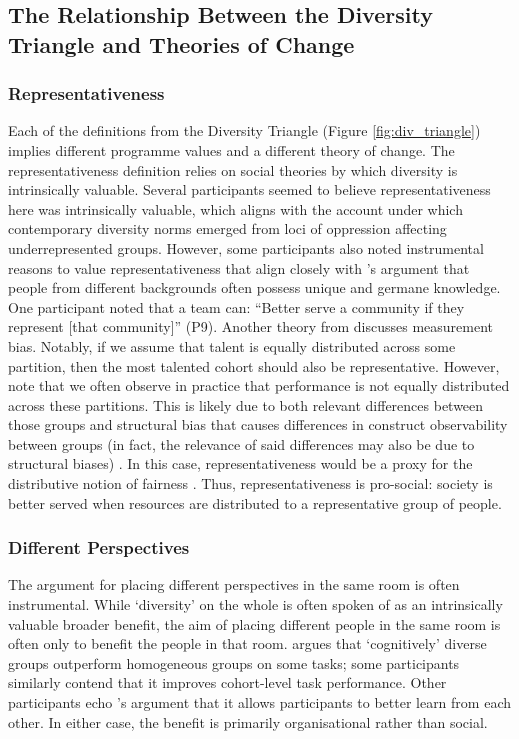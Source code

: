 \subsection{The Relationship Between the Diversity Triangle and Theories of Change}
\subsubsection{Representativeness}
Each of the definitions from the Diversity Triangle (Figure \ref{fig:div_triangle}) implies different programme values and a different theory of change. The representativeness
definition relies on social theories by which diversity is intrinsically valuable. Several participants seemed to believe representativeness here was intrinsically valuable, which aligns with the \textcite{morris1984origins} account under which contemporary diversity norms emerged from loci of oppression affecting underrepresented groups. However, some participants also noted instrumental reasons to value representativeness that align closely with \textcite{peters2021hidden,page2008difference}'s argument that people from different backgrounds often possess unique and germane knowledge. One participant noted that a team can: ``Better serve a community if they represent [that community]'' (P9). Another theory from \textcite{Friedler_Scheidegger_Venkatasubramanian_2016} discusses measurement bias. Notably, if we assume that talent is equally distributed across some partition, then the most talented cohort should also be representative. However, \textcite{Friedler_Scheidegger_Venkatasubramanian_2016} note that we often observe in practice that performance is not equally distributed across these partitions. This is likely due to both relevant differences between those groups and structural bias that causes differences in construct observability between groups (in fact, the relevance of said differences may also be due to structural biases) \cite{Friedler_Scheidegger_Venkatasubramanian_2016}. In this case, representativeness would be a proxy for the distributive notion of fairness \cite{Olsaretti_2018}. Thus, representativeness is pro-social: society is better served when resources are distributed to a representative group of people.

\subsubsection{Different Perspectives}
The argument for placing different perspectives in the same room is often instrumental. While `diversity' on the whole is often spoken of as an intrinsically valuable broader benefit, the aim of placing different people in the same room is often only to benefit the people in that room. \textcite{page_diversity_2010} argues that `cognitively' diverse groups outperform homogeneous groups on some tasks; some participants similarly contend that it improves cohort-level task performance. Other participants echo \textcite{wylie2006introduction}'s argument that it allows participants to better learn from each other. In either case, the benefit is primarily organisational rather than social.

